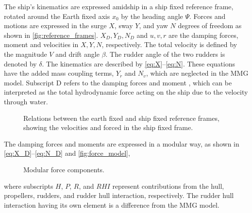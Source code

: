 The ship's kinematics are expressed amidship in a ship fixed reference frame, rotated around the Earth fixed axis $x_0$ by the heading angle \(\Psi\). Forces and motions are expressed in the surge $X$, sway $Y$, and yaw $N$ degrees of freedom as shown in \autoref{fig:reference_frames}. 
$X_D,Y_D,N_D$ and $u,v,r$ are the damping forces, moment and velocities in $X,Y,N$, respectively.
The total velocity is defined by the magnitude \(V\) and drift angle \(\beta\). The rudder angle of the two rudders is denoted by \(\delta\).
The kinematics are described by \autoref{eq:X}--\autoref{eq:N}. 
These equations have the added mass coupling terms, $Y_{\dot{r}}$ and $N_{\dot{v}}$, which are neglected in the MMG model. Subscript D refers to the damping forces and moment \citep{fossen_handbook_2021}, which can be interpreted as the total hydrodynamic force acting on the ship due to the velocity through water.
%
\begin{figure}[h]
    \centering
    
    \caption{Relations between the earth fixed and ship fixed reference frames, showing the velocities and forced in the ship fixed frame.}
    \label{fig:reference_frames}
\end{figure}
%
\begin{equation}
    \label{eq:X}
    
\end{equation}
%
\begin{equation}
    \label{eq:Y}
    
\end{equation}
%
\begin{equation}
    \label{eq:N}
    
\end{equation}
The damping forces and moments are expressed in a modular way, as shown in \autoref{eq:X_D}--\autoref{eq:N_D} and \autoref{fig:force_model},
\begin{equation}
    \label{eq:X_D}
    
\end{equation}
%
\begin{equation}
    \label{eq:Y_D}
    
\end{equation}
%
\begin{equation}
    \label{eq:N_D}
    
\end{equation}
%
\begin{figure}[h]
    \centering
    
    \caption{Modular force components.}
    \label{fig:force_model}
\end{figure}
where subscripts $H$, $P$, $R$, and $RHI$ represent contributions from the hull, propellers, rudders, and rudder hull interaction, respectively. The rudder hull interaction having its own element is a difference from the MMG model.


